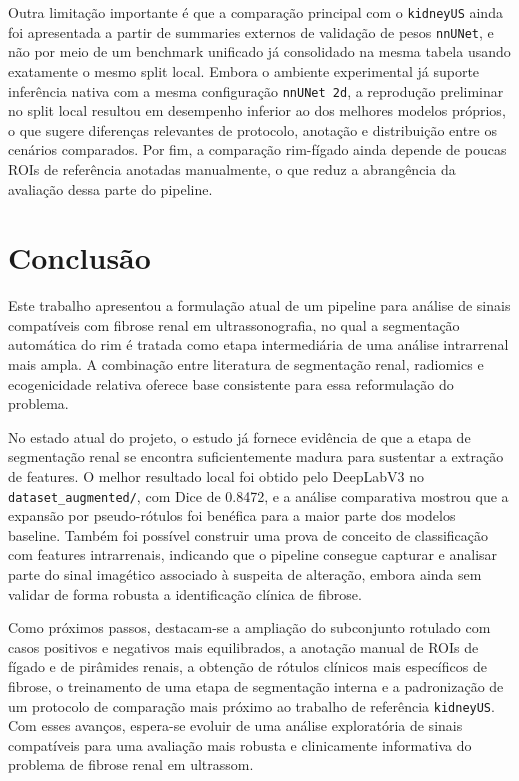 \documentclass[12pt]{article}
\begin{document}
Outra limitação importante é que a comparação principal com o \texttt{kidneyUS} ainda foi apresentada a partir de summaries externos de validação de pesos \texttt{nnUNet}, e não por meio de um benchmark unificado já consolidado na mesma tabela usando exatamente o mesmo split local. Embora o ambiente experimental já suporte inferência nativa com a mesma configuração \texttt{nnUNet 2d}, a reprodução preliminar no split local resultou em desempenho inferior ao dos melhores modelos próprios, o que sugere diferenças relevantes de protocolo, anotação e distribuição entre os cenários comparados. Por fim, a comparação rim-fígado ainda depende de poucas ROIs de referência anotadas manualmente, o que reduz a abrangência da avaliação dessa parte do pipeline.

\section{Conclusão}

Este trabalho apresentou a formulação atual de um pipeline para análise de sinais compatíveis com fibrose renal em ultrassonografia, no qual a segmentação automática do rim é tratada como etapa intermediária de uma análise intrarrenal mais ampla. A combinação entre literatura de segmentação renal, radiomics e ecogenicidade relativa oferece base consistente para essa reformulação do problema.

No estado atual do projeto, o estudo já fornece evidência de que a etapa de segmentação renal se encontra suficientemente madura para sustentar a extração de features. O melhor resultado local foi obtido pelo DeepLabV3 no \texttt{dataset\_augmented/}, com Dice de 0.8472, e a análise comparativa mostrou que a expansão por pseudo-rótulos foi benéfica para a maior parte dos modelos baseline. Também foi possível construir uma prova de conceito de classificação com features intrarrenais, indicando que o pipeline consegue capturar e analisar parte do sinal imagético associado à suspeita de alteração, embora ainda sem validar de forma robusta a identificação clínica de fibrose.

Como próximos passos, destacam-se a ampliação do subconjunto rotulado com casos positivos e negativos mais equilibrados, a anotação manual de ROIs de fígado e de pirâmides renais, a obtenção de rótulos clínicos mais específicos de fibrose, o treinamento de uma etapa de segmentação interna e a padronização de um protocolo de comparação mais próximo ao trabalho de referência \texttt{kidneyUS}. Com esses avanços, espera-se evoluir de uma análise exploratória de sinais compatíveis para uma avaliação mais robusta e clinicamente informativa do problema de fibrose renal em ultrassom.

\nocite{*}



\end{document}
